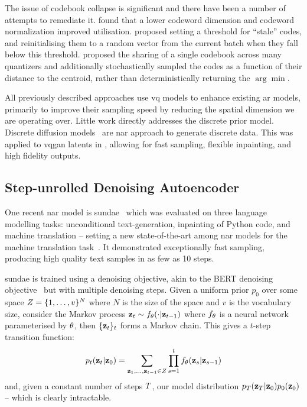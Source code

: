 The issue of codebook collapse is significant and there have been a number
of attempts to remediate it. \cite{yu2021vqgan} found that a lower codeword
dimension and codeword normalization improved utilisation.
\cite{zeghidour2021soundstream} proposed setting a threshold for ``stale'' codes,
and reinitialising them to a random vector from the current batch when they
fall below this threshold. \cite{lee2022rqvae} proposed the sharing of a single
codebook across many quantizers and additionally stochastically sampled the
codes as a function of their distance to the centroid, rather than
deterministically returning the $\arg\min$.

All previously described approaches use \gls{vq} models to enhance existing
\gls{ar} models, primarily to improve their sampling speed by reducing the
spatial dimension we are operating over. Little work directly addresses the
discrete prior model. Discrete diffusion models~\cite{austin2021structured} are
\gls{nar} approach to generate discrete data. This was applied to \gls{vqgan}
latents in \citet{bondtaylor2021unleashing}, allowing for fast sampling,
flexible inpainting, and high fidelity outputs.

\subsection{Step-unrolled Denoising Autoencoder}
\label{subsec:sundae}

One recent \gls{nar} model is \gls{sundae}~\cite{savinov2022stepunrolled} which
was evaluated on three language modelling tasks: unconditional text-generation,
inpainting of Python code, and machine translation -- setting a new
state-of-the-art among \gls{nar} models for the machine translation
task~\cite{savinov2022stepunrolled}. It demonstrated exceptionally fast
sampling, producing high quality text samples in as few as 10 steps.

\Gls{sundae} is trained using a denoising objective, akin to the
BERT denoising objective~\cite{wang2019bert} but with multiple denoising steps.
Given a uniform prior $p_0$ over some space $Z = \{1, \dots,
v\}^N$ where $N$ is the size of the space and $v$ is the
vocabulary size, consider the Markov process $\mathbf{z}_t \sim f_\theta(\cdot \vert
\mathbf{z}_{t-1})$ where $f_\theta$ is a neural network parameterised by
$\theta$, then $\{\mathbf{z}_t\}_t$ forms a Markov chain. This gives a
$t$-step transition function: 
\begin{equation}\label{eq:markov} p_t(\mathbf{z}_t
    \vert \mathbf{z}_0) = \sum\limits_{\mathbf{z}_1, \dots, \mathbf{z}_{t-1} \in
    Z} \prod\limits^t_{s=1} f_\theta(\mathbf{z}_s | \mathbf{z}_{s-1})
\end{equation}
\cite{savinov2022stepunrolled} and, given a constant number of steps
$T$, our model distribution $p_T(\mathbf{z}_T
\vert \mathbf{z}_0)p_0(\mathbf{z}_0)$ -- which is clearly intractable.

